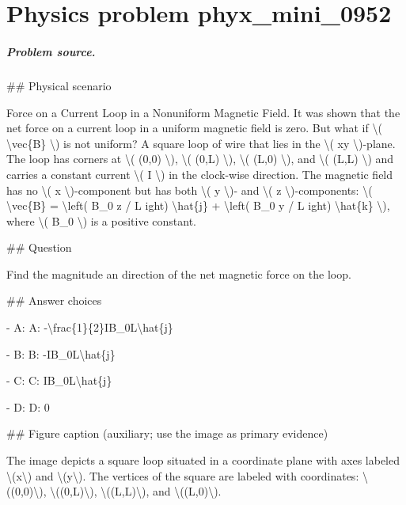 
\chapter{Physics problem phyx\_mini\_0952}
\label{ch:PhyXMiniProblems_problem_phyx_mini_0952}

\paragraph{Problem source.}
\#\# Physical scenario

Force on a Current Loop in a Nonuniform Magnetic Field. It was shown that the net force on a current loop in a uniform magnetic field is zero. But what if \textbackslash{}( \textbackslash{}vec\{B\} \textbackslash{}) is not uniform? A square loop of wire that lies in the \textbackslash{}( xy \textbackslash{})-plane. The loop has corners at \textbackslash{}( (0,0) \textbackslash{}), \textbackslash{}( (0,L) \textbackslash{}), \textbackslash{}( (L,0) \textbackslash{}), and \textbackslash{}( (L,L) \textbackslash{}) and carries a constant current \textbackslash{}( I \textbackslash{}) in the clock-wise direction. The magnetic field has no \textbackslash{}( x \textbackslash{})-component but has both \textbackslash{}( y \textbackslash{})- and \textbackslash{}( z \textbackslash{})-components: \textbackslash{}( \textbackslash{}vec\{B\} = \textbackslash{}left( B\_0 z / L 
ight) \textbackslash{}hat\{j\} + \textbackslash{}left( B\_0 y / L 
ight) \textbackslash{}hat\{k\} \textbackslash{}), where \textbackslash{}( B\_0 \textbackslash{}) is a positive constant.

\#\# Question

Find the magnitude an direction of the net magnetic force on the loop.

\#\# Answer choices

- A: A: -\textbackslash{}frac\{1\}\{2\}IB\_0L\textbackslash{}hat\{j\}

- B: B: -IB\_0L\textbackslash{}hat\{j\}

- C: C: IB\_0L\textbackslash{}hat\{j\}

- D: D: 0

\#\# Figure caption (auxiliary; use the image as primary evidence)

The image depicts a square loop situated in a coordinate plane with axes labeled \textbackslash{}(x\textbackslash{}) and \textbackslash{}(y\textbackslash{}). The vertices of the square are labeled with coordinates: \textbackslash{}((0,0)\textbackslash{}), \textbackslash{}((0,L)\textbackslash{}), \textbackslash{}((L,L)\textbackslash{}), and \textbackslash{}((L,0)\textbackslash{}). 

